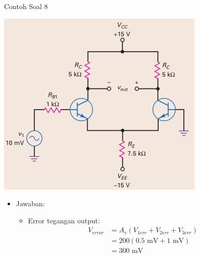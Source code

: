 \documentclass[aspectratio=169]{beamer}
\begin{document}
\begin{frame}{Contoh Soal 8}
	\begin{multicols}{2}
		\begin{center}
			\includegraphics[height=0.7\textheight]{gambar/01.diff-amp/01.latihan_soal_8}
		\end{center}
		\columnbreak
		\begin{itemize}
			\item Jawaban:
			\begin{itemize}
				\item Error tegangan output:
				\begin{align*}
					V_{error} &= A_v (V_{1err} + V_{2err} + V_{3err}) \\
					&= 200(0.5 \text{ mV} + 1 \text{ mV}) \\
					&= 300 \text{ mV}
				\end{align*}
			\end{itemize}
		\end{itemize}
	\end{multicols}
\end{frame}
\end{document}
